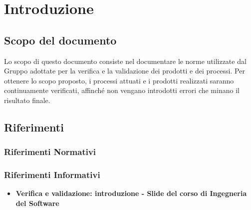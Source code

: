 \documentclass[PianoDiQualifica.tex]{subfiles}
\begin{document}
\chapter{Introduzione}

	\section{Scopo del documento}
	Lo scopo di questo documento consiste nel documentare le norme utilizzate dal Gruppo \gruppo adottate per la verifica e la validazione dei prodotti e dei processi. Per ottenere lo scopo proposto, i processi attuati e i prodotti realizzati saranno continuamente verificati, affinché non vengano introdotti errori che minano il risultato finale.
	
	\scopoProdotto
	
	\glossExpl
	
	\section{Riferimenti}
		\subsection{Riferimenti Normativi}
		
		\subsection{Riferimenti Informativi}
		\begin{itemize}
			\item \textbf{Verifica e validazione: introduzione - Slide del corso di Ingegneria del Software}\\
		\end{itemize}
\end{document}
